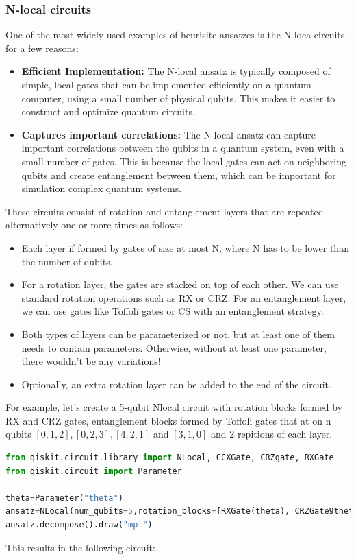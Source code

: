 \documentclass[12pt, oneside]{book}
\theoremstyle{definition}
\theoremstyle{definition}
\theoremstyle{remark}
\begin{document}
\subsubsection{N-local circuits}
One of the most widely used examples of heurisitc ansatzes is the N-loca circuits, for a few reasons:
\begin{itemize}
    \item \textbf{Efficient Implementation: } The N-local ansatz is typically composed of simple, local gates that can be implemented efficiently on a quantum computer, using a small number of physical qubits. This makes it easier to construct and optimize quantum circuits.
    \item \textbf{Captures important correlations: } The N-local ansatz can capture important correlations between the qubits in a quantum system, even with a small number of gates. This is because the local gates can act on neighboring qubits and create entanglement between them, which can be important for simulation complex quantum systems.
\end{itemize}
These circuits consist of rotation and entanglement layers that are repeated alternatively one or more times as follows:
\begin{itemize}
    \item Each layer if formed by gates of size at most N, where N has to be lower than the number of qubits.
    \item For a rotation layer, the gates are stacked on top of each other. We can use standard rotation operations such as RX or CRZ. For an entanglement layer, we can use gates like Toffoli gates or CS with an entanglement strategy.
    \item Both types of layers can be parameterized or not, but at least one of them needs to contain parameters. Otherwise, without at least one parameter, there wouldn't be any variations!
    \item Optionally, an extra rotation layer can be added to the end of the circuit.
\end{itemize}
For example, let's create a 5-qubit Nlocal circuit with rotation blocks formed by RX and CRZ gates, entanglement blocks formed by Toffoli gates that at on n qubits $[0,1,2], [0,2,3],[4,2,1]$ and $[3,1,0]$ and 2 repitions of each layer.
\begin{lstlisting}[language=Python]
from qiskit.circuit.library import NLocal, CCXGate, CRZgate, RXGate
from qiskit.circuit import Parameter

theta=Parameter("theta")
ansatz=NLocal(num_qubits=5,rotation_blocks=[RXGate(theta), CRZGate9theta)],entanglement_blocks=CCXGate(),entanglement=[[0,1,2],[0,2,3],[4,2,1],[3,1,0]],reps=2,insert_barriers=True)
ansatz.decompose().draw("mpl")
\end{lstlisting}
This results in the following circuit:
\end{document}
